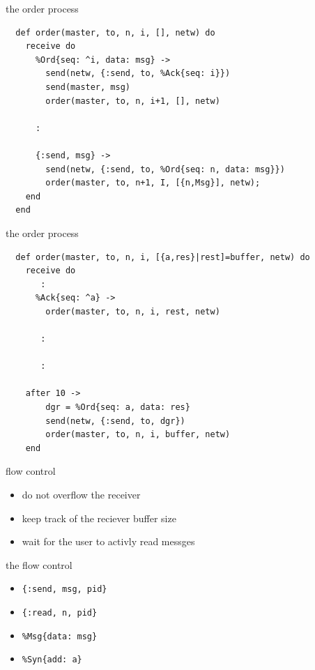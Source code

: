 \begin{frame}[fragile]{the order process}

\begin{verbatim}
  def order(master, to, n, i, [], netw) do
    receive do
      %Ord{seq: ^i, data: msg} ->
        send(netw, {:send, to, %Ack{seq: i}})
        send(master, msg)
        order(master, to, n, i+1, [], netw)
        
      :
         
      {:send, msg} ->
        send(netw, {:send, to, %Ord{seq: n, data: msg}})
        order(master, to, n+1, I, [{n,Msg}], netw);
    end
  end
\end{verbatim}
  
\end{frame}

\begin{frame}[fragile]{the order process}

\begin{verbatim}
  def order(master, to, n, i, [{a,res}|rest]=buffer, netw) do
    receive do
       :
      %Ack{seq: ^a} ->
        order(master, to, n, i, rest, netw)

       :

       :
                
    after 10 ->
        dgr = %Ord{seq: a, data: res}
        send(netw, {:send, to, dgr})
        order(master, to, n, i, buffer, netw)
    end
\end{verbatim}
\end{frame}

\begin{frame}{flow control}

 \begin{itemize}
  \item do not overflow the receiver \pause
  \item keep track of the reciever buffer size  \pause
  \item wait for the user to activly read messges \pause
\end{itemize}

\vspace{20pt}{\em We are introducing a synchronous interface - only send if receiver prepared.}

\end{frame}

\begin{frame}{the flow control}

  \begin{itemize}
  \item {\tt \{:send, msg, pid\}} 

  \item {\tt \{:read, n, pid\}} 


  \item {\tt \%Msg\{data: msg\}}

  \item {\tt \%Syn\{add: a\}}

      
\end{itemize}
  
\end{frame}

